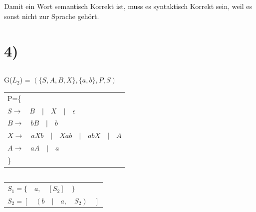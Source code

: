 \documentclass[12pt]{article}
\begin{document}
\subsection{}
\begin{center}
    Damit ein Wort semantisch Korrekt ist, muss es syntaktisch Korrekt sein, weil es sonst nicht zur Sprache gehört.
\end{center}
 \pagebreak %
 
 

\section{4)}
\subsection{}
\begin{center}
    G($L_2$) = $(\{S, A, B, X\}, \{a, b\}, P, S)$ \\
\end{center}
\begin{center}
  \begin{tabular}{l}
    P=\{ \\
    \quad$S \rightarrow \quad B \quad|\quad X \quad|\quad \epsilon$ \\
    \quad$B \rightarrow \quad bB \quad|\quad b $ \\
    \quad$X \rightarrow \quad aXb \quad|\quad Xab \quad|\quad abX \quad|\quad A$ \\
    \quad$A \rightarrow \quad aA \quad|\quad a $ \\
    \}
 \end{tabular}
\end{center}

\subsection{}
\begin{center}
 \begin{tabular}{l}

    $ S_1 = \{\quad a,\quad [S_2]\quad\} $ \\
    $ S_2 = [\quad (b \quad|\quad a, \quad S_2)\quad] $
 \end{tabular}
\end{center}
\end{document}
